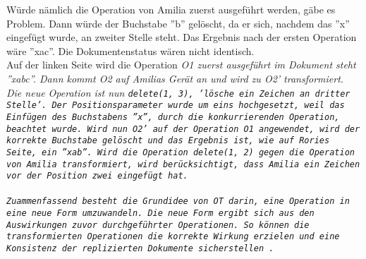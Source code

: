 %
Würde nämlich die Operation von Amilia zuerst ausgeführt werden, gäbe es Problem. Dann würde der Buchstabe ''b'' gelöscht, da er sich, nachdem das ''x'' eingefügt wurde, an zweiter Stelle steht. Das Ergebnis nach der ersten Operation wäre ''xac''. Die Dokumentenstatus wären nicht identisch.\\
%
Auf der linken Seite wird die Operation \it{O1} zuerst ausgeführt im Dokument steht ''xabc''. Dann kommt \it{O2} auf Amilias Gerät an und wird zu \it{O2'} transformiert. Die neue Operation ist nun \tt{delete(1, 3)}, 'lösche ein Zeichen an dritter Stelle'. Der Positionsparameter wurde um eins hochgesetzt, weil das Einfügen des Buchstabens ''x'', durch die konkurrierenden Operation, beachtet wurde. Wird nun \it{O2'} auf der Operation \it{O1} angewendet, wird der korrekte Buchstabe gelöscht und das Ergebnis ist, wie auf Rories Seite, ein ''xab''.
Wird die Operation \tt{delete(1, 2)} gegen die Operation von Amilia transformiert, wird berücksichtigt, dass Amilia ein Zeichen vor der Position zwei eingefügt hat.\\\\
%
%
Zuammenfassend besteht die Grundidee von \gls{OT} darin, eine Operation in eine neue Form umzuwandeln. Die neue Form ergibt sich aus den Auswirkungen zuvor durchgeführter Operationen. So können die transformierten Operationen die korrekte Wirkung erzielen und eine Konsistenz der replizierten Dokumente sicherstellen~\cite{ot-later}.
%
%
